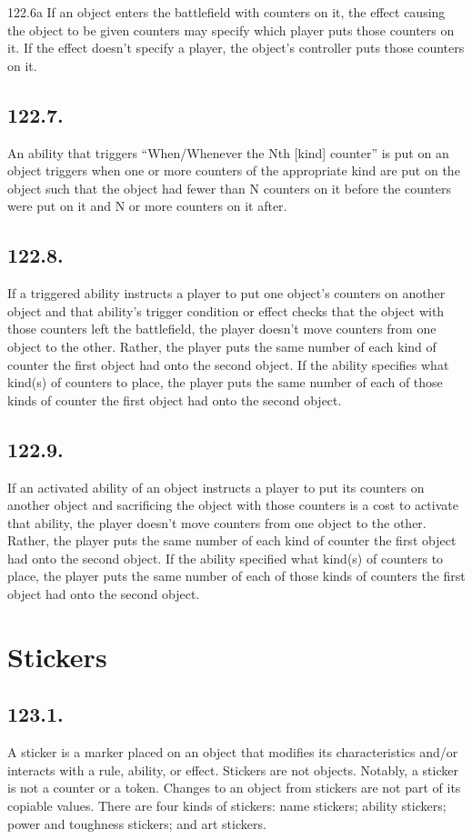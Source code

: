 122.6a If an object enters the battlefield with counters on it, the effect causing the object to be given counters may specify which player puts those counters on it. If the effect doesn’t specify a player, the object’s controller puts those counters on it.

\subsection*{122.7.}
An ability that triggers “When/Whenever the Nth [kind] counter” is put on an object triggers when one or more counters of the appropriate kind are put on the object such that the object had fewer than N counters on it before the counters were put on it and N or more counters on it after.

\subsection*{122.8.}
If a triggered ability instructs a player to put one object’s counters on another object and that ability’s trigger condition or effect checks that the object with those counters left the battlefield, the player doesn’t move counters from one object to the other. Rather, the player puts the same number of each kind of counter the first object had onto the second object. If the ability specifies what kind(s) of counters to place, the player puts the same number of each of those kinds of counter the first object had onto the second object.

\subsection*{122.9.}
If an activated ability of an object instructs a player to put its counters on another object and sacrificing the object with those counters is a cost to activate that ability, the player doesn’t move counters from one object to the other. Rather, the player puts the same number of each kind of counter the first object had onto the second object. If the ability specified what kind(s) of counters to place, the player puts the same number of each of those kinds of counters the first object had onto the second object.

\section{Stickers}
\subsection*{123.1.}
A sticker is a marker placed on an object that modifies its characteristics and/or interacts with a rule, ability, or effect. Stickers are not objects. Notably, a sticker is not a counter or a token. Changes to an object from stickers are not part of its copiable values. There are four kinds of stickers: name stickers; ability stickers; power and toughness stickers; and art stickers.

